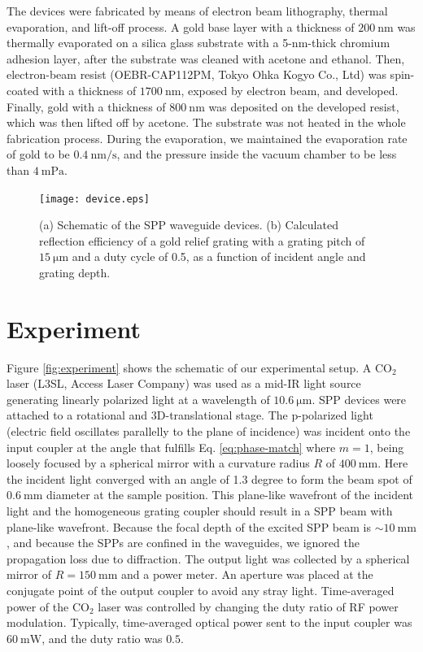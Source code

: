\documentclass[aip,apl,reprint]{revtex4-1}
\begin{document}
The devices were fabricated by means of electron beam lithography, thermal evaporation, and lift-off process. A gold base layer with a thickness of $200\:\mathrm{nm}$ was thermally evaporated on a silica glass substrate with a 5-nm-thick chromium adhesion layer, after the substrate was cleaned with acetone and ethanol. Then, electron-beam resist (OEBR-CAP112PM, Tokyo Ohka Kogyo Co., Ltd) was spin-coated with a thickness of $1700\:\mathrm{nm}$, exposed by electron beam, and developed. Finally, gold with a thickness of $800\:\mathrm{nm}$ was deposited on the developed resist, which was then lifted off by acetone. The substrate was not heated in the whole fabrication process. During the evaporation, we maintained the evaporation rate of gold to be $0.4\:\mathrm{nm/s}$, and the pressure inside the vacuum chamber to be less than $4\:\mathrm{mPa}$.

 \begin{figure}
    \texttt{[image: device.eps]}
    \caption{(a) Schematic of the SPP waveguide devices. (b) Calculated reflection efficiency of a gold relief grating with a grating pitch of $15\:\mathrm{\mu m}$ and a duty cycle of 0.5, as a function of incident angle and grating depth.}
     \label{fig:device}
\end{figure}

\section{Experiment}
\label{sec:experiment}
Figure \ref{fig:experiment} shows the schematic of our experimental setup. 
A $\mathrm{CO_2}$ laser (L3SL, Access Laser Company) was used as a mid-IR light source generating linearly polarized light at a wavelength of $10.6\:\mathrm{\mu m}$. 
SPP devices were attached to a rotational and 3D-translational stage. 
The p-polarized light (electric field oscillates parallelly to the plane of incidence) was incident onto the input coupler at the angle that fulfills Eq. \ref{eq:phase-match} where $m=1$, being loosely focused by a spherical mirror with a curvature radius $R$ of $400\:\mathrm{mm}$.  Here the incident light converged with an angle of 1.3 degree to form the beam spot of $0.6\:\mathrm{mm}$ diameter at the sample position. This plane-like wavefront of the incident light and the homogeneous grating coupler should result in a SPP beam with plane-like wavefront. Because the focal depth of the excited SPP beam is $\sim10\:\mathrm{mm}$, and because the SPPs are confined in the waveguides, we ignored the propagation loss due to diffraction.
The output light was collected by a spherical mirror of $R=150\:\mathrm{mm}$ and a power meter. 
An aperture was placed at the conjugate point of the output coupler to avoid any stray light. 
Time-averaged power of the $\mathrm{CO_2}$ laser was controlled by changing the duty ratio of RF power modulation.
Typically, time-averaged optical power sent to the input coupler was $60\:\mathrm{mW}$, and the duty ratio was $0.5$. 
\end{document}
